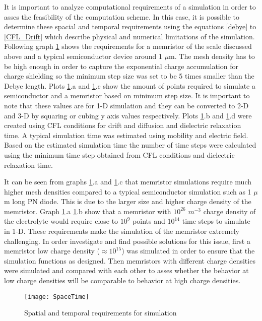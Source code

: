 {It is important to analyze computational requirements of a simulation in order to asses the feasibility of the computation scheme. In this case, it is possible to determine these spacial and temporal requirements using the equations \ref{debye} to \ref{CFL_Drift} which describe physical and numerical limitations of the simulation. Following graph \ref{SpaceTime} shows the requirements for a memristor of the scale discussed above and a typical semiconductor device around 1 $\mu$m. The mesh density has to be high enough in order to capture the exponential charge accumulation for charge shielding so the minimum step size was set to be 5 times smaller than the Debye length. Plots \ref{SpaceTime}.a and \ref{SpaceTime}.c show the amount of points required to simulate a semiconductor and a memristor based on minimum step size. It is important to note that these values are for 1-D simulation and they can be converted to 2-D and 3-D by squaring or cubing y axis values respectively. Plots \ref{SpaceTime}.b and \ref{SpaceTime}.d were created using CFL conditions for drift and diffusion and dielectric relaxation time. A typical simulation time was estimated using mobility and electric field. Based on the estimated simulation time the number of time steps were calculated using the minimum time step obtained from CFL conditions and dielectric relaxation time.

It can be seen from graphs \ref{SpaceTime}.a and \ref{SpaceTime}.c that memristor simulations require much higher mesh densities compared to a typical semiconductor simulation such as 1 $\mu$m long PN diode. This is due to the larger size and higher charge density of the memristor. Graph \ref{SpaceTime}.a \ref{SpaceTime}.b show that a memristor with $10^{26}$ $m^{-3}$ charge density of the electrolyte would require close to $10^9$ points and $10^{14}$ time steps to simulate in 1-D. These requirements make the simulation of the memristor extremely challenging. In order investigate and find possible solutions for this issue, first a memristor low charge density ($\approx 10^{15}$) was simulated in order to ensure that the simulation functions as designed. Then memristors with different charge densities were simulated and compared with each other to asses whether the behavior at low charge densities will be comparable to behavior at high charge densities.

\begin{landscape}
\begin{figure}[htp]
\centering
\texttt{[image: SpaceTime]}
\caption{Spatial and temporal requirements for simulation} 
\label{SpaceTime}
\end{figure}
\end{landscape}


}
